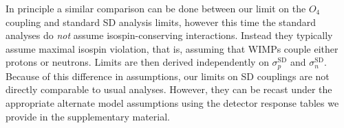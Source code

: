 In principle a similar comparison can be done between our limit on the $O_4$ coupling and standard SD analysis limits, however this time the standard analyses do {\em not} assume isospin-conserving interactions. Instead they typically assume maximal isospin violation, that is, assuming that WIMPs couple either protons or neutrons. Limits are then derived independently on $\sigma_{p}^\mathrm{SD}$ and $\sigma_{n}^\mathrm{SD}$. Because of this difference in assumptions, our limits on SD couplings are not directly comparable to usual analyses. However, they can be recast under the appropriate alternate model assumptions using the detector response tables we provide in the supplementary material.
 
